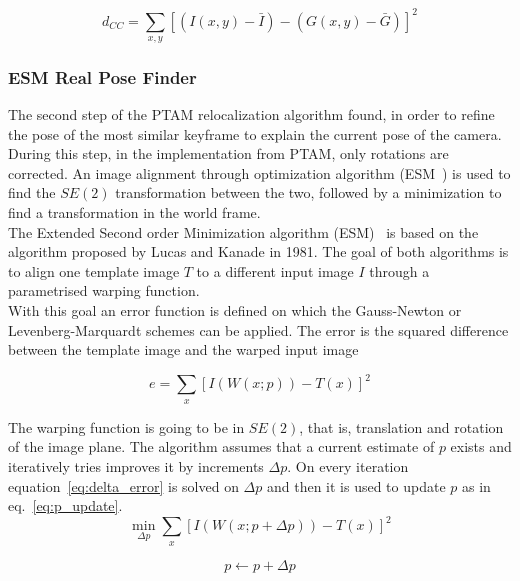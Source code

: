 \begin{equation}
  d_{CC} = \sum_{x,y} [(I(x,y) - \bar{I}) - (G(x,y) - \bar{G})]^2
  \label{eq:CC}
\end{equation}


\subsubsection{ESM Real Pose Finder}
\label{ssub:real_pose_finder}

The second step of the PTAM relocalization algorithm found, in order to refine the pose of the most similar keyframe to explain the current pose of the camera. During this step, in the implementation from PTAM, only rotations are corrected. An image alignment through optimization algorithm (ESM~\cite{lovegrove2012parametric}) is used to find the $SE(2)$ transformation between the two, followed by a minimization to find a transformation in the world frame.\\

The Extended Second order Minimization algorithm (ESM)~\cite{lovegrove2012parametric} is based on the algorithm proposed by Lucas and Kanade \cite{Baker2004} in 1981. The goal of both algorithms is to align one template image $T$ to a different input image $I$ through a parametrised warping function. \\

With this goal an error function is defined on which the Gauss-Newton or Levenberg-Marquardt schemes can be applied. The error is the squared difference between the template image and the warped input image

\begin{equation}
  e = \sum_x [I(W(x;p)) - T(x)]^2
\end{equation}

The warping function is going to be in $SE(2)$, that is, translation and rotation of the image plane. The algorithm assumes that a current estimate of $p$ exists and iteratively tries improves it by increments $\Delta p$. On every  iteration equation~\ref{eq:delta_error} is solved on $\Delta p$ and then it is used to update $p$ as in eq.~\ref{eq:p_update}.\\

\begin{equation}
  \min_{\Delta p}  \sum_x [I(W(x;p + \Delta p)) - T(x)]^2
  \label{eq:delta_error}
\end{equation}

\begin{equation}
  p \leftarrow p + \Delta p
  \label{eq:p_update}
\end{equation}



